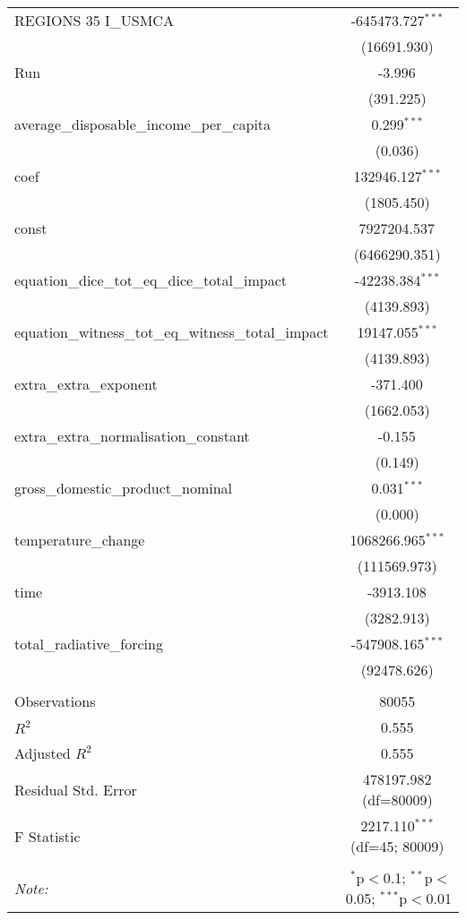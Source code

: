\begin{table}[!htbp]
\begin{tabular}{@{\extracolsep{5pt}}lc}
 REGIONS 35 I\_USMCA & -645473.727$^{***}$ \\
& (16691.930) \\
 Run & -3.996$^{}$ \\
& (391.225) \\
 average\_disposable\_income\_per\_capita & 0.299$^{***}$ \\
& (0.036) \\
 coef & 132946.127$^{***}$ \\
& (1805.450) \\
 const & 7927204.537$^{}$ \\
& (6466290.351) \\
 equation\_dice\_tot\_eq\_dice\_total\_impact & -42238.384$^{***}$ \\
& (4139.893) \\
 equation\_witness\_tot\_eq\_witness\_total\_impact & 19147.055$^{***}$ \\
& (4139.893) \\
 extra\_extra\_exponent & -371.400$^{}$ \\
& (1662.053) \\
 extra\_extra\_normalisation\_constant & -0.155$^{}$ \\
& (0.149) \\
 gross\_domestic\_product\_nominal & 0.031$^{***}$ \\
& (0.000) \\
 temperature\_change & 1068266.965$^{***}$ \\
& (111569.973) \\
 time & -3913.108$^{}$ \\
& (3282.913) \\
 total\_radiative\_forcing & -547908.165$^{***}$ \\
& (92478.626) \\
\hline \\[-1.8ex]
 Observations & 80055 \\
 $R^2$ & 0.555 \\
 Adjusted $R^2$ & 0.555 \\
 Residual Std. Error & 478197.982 (df=80009) \\
 F Statistic & 2217.110$^{***}$ (df=45; 80009) \\
\hline
\hline \\[-1.8ex]
\textit{Note:} & \multicolumn{1}{r}{$^{*}$p$<$0.1; $^{**}$p$<$0.05; $^{***}$p$<$0.01} \\
\end{tabular}
\end{table}
